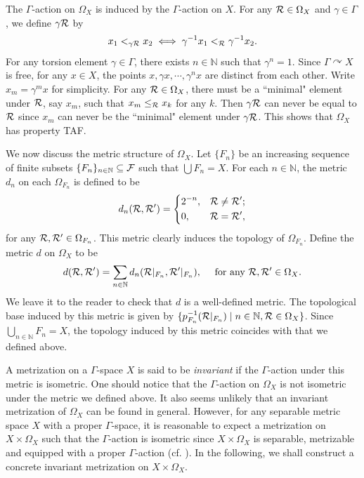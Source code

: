 \documentclass[11pt]{article}
\theoremstyle{definition}
\theoremstyle{plain}
\def\IN{\mathbb N}\def\IR{\mathbb R}\def\IE{\mathbb E}\def\IC{\mathbb C}\def\IL{\mathbb L}\def\IQ{\mathbb Q}\def\IA{\mathbb A}\def\IZ{\mathbb Z}
\def\Ga{\Gamma}
\def\car{\curvearrowright}
\begin{document}
The $\Ga$-action on $\Omega_X$ is induced by the $\Ga$-action on $X$. For any $\mathcal R\in\Omega_X$ and $\gamma\in\Ga$, we define $\gamma\mathcal R$ by
$$x_1<_{\gamma \mathcal R} x_2\iff \gamma^{-1}x_1<_{\mathcal R}\gamma^{-1}x_2.$$
For any torsion element $\gamma\in\Ga$, there exists $n\in\IN$ such that $\gamma^n=1$. Since $\Ga\car X$ is free, for any $x\in X$, the points $x,\gamma x,\cdots,\gamma^n x$ are distinct from each other. Write $x_m=\gamma^mx$ for simplicity. For any $\mathcal R\in\Omega_X$, there must be a ``minimal" element under $\mathcal R$, say $x_m$, such that $x_m\leq_\mathcal R x_k$ for any $k$. Then $\gamma\mathcal R$ can never be equal to $\mathcal R$ since $x_m$ can never be the ``minimal" element under $\gamma\mathcal R$. This shows that $\Omega_X$ has property TAF.

We now discuss the metric structure of $\Omega_X$. Let $\{F_n\}$ be an increasing sequence of finite subsets $\{F_n\}_{n\in\IN}\subseteq\F$ such that $\bigcup F_n=X$. For each $n\in\IN$, the metric $d_n$ on each $\Omega_{F_n}$ is defined to be
$$d_n(\mathcal R,\mathcal R')=\left\{\begin{aligned}&2^{-n},&&\mathcal R\ne\mathcal R';\\&0,&&\mathcal R=\mathcal R',\end{aligned}\right.$$
for any $\mathcal R,\mathcal R'\in \Omega_{F_n}$. This metric clearly induces the topology of $\Omega_{F_n}$. Define the metric $d$ on $\Omega_X$ to be
$$d(\R,\R')=\sum_{n\in\IN}d_n(\R|_{F_n},\R'|_{F_n}),\quad\text{ for any }\R,\R'\in\Omega_X.$$
We leave it to the reader to check that $d$ is a well-defined metric. The topological base induced by this metric is given by $\{p^{-1}_{F_n}(\R|_{F_n})\mid n\in\IN,\R\in\Omega_X\}$. Since $\bigcup_{n\in\IN}F_n=X$, the topology induced by this metric coincides with that we defined above. 

A metrization on a $\Ga$-space $X$ is said to be \emph{invariant} if the $\Ga$-action under this metric is isometric. One should notice that the $\Ga$-action on $\Omega_X$ is not isometric under the metric we defined above. It also seems unlikely that an invariant metrization of $\Omega_X$ can be found in general.  However, for any separable metric space $X$ with a proper $\Ga$-space, it is reasonable to expect a metrization on $X\times\Omega_X$ such that the $\Ga$-action is isometric since $X\times\Omega_X$ is separable, metrizable and equipped with a proper $\Ga$-action (cf. \cite[Theorem 4.3.4]{metrizationGaspace}). In the following, we shall construct a concrete invariant metrization on $X\times\Omega_X$.
\end{document}

